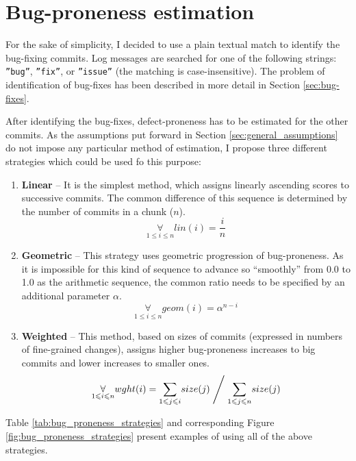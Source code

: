 \documentclass{pracamgr}
\begin{document}

\section{Bug-proneness estimation}
\label{sec:bug-proneness}
For the sake of simplicity, I decided to use a plain textual match to identify the bug-fixing commits. Log messages are searched for one of the following strings: \texttt{''bug''}, \texttt{''fix''}, or \texttt{''issue''} (the matching is case-insensitive). The problem of identification of bug-fixes has been described in more detail in Section \ref{sec:bug-fixes}.

After identifying the bug-fixes, defect-proneness has to be estimated for the other commits. As the assumptions put forward in Section \ref{sec:general_assumptions} do not impose any particular method of estimation, I propose three different strategies which could be used fo this purpose:
\begin{enumerate}[label=(S\arabic*)]
	\item \textbf{Linear} -- It is the simplest method, which assigns linearly ascending scores to successive commits. The common difference of this sequence is determined by the number of commits in a chunk ($n$).
	\[ \underset{1 \leqslant i \leqslant n}{\forall} lin(i) = \frac{i}{n} \]
	\item \textbf{Geometric} -- This strategy uses geometric progression of bug-proneness. As it is impossible for this kind of sequence to advance so ``smoothly'' from 0.0 to 1.0 as the arithmetic sequence, the common ratio needs to be specified by an additional parameter $\alpha$.
	\[ \underset{1 \leqslant i \leqslant n}{\forall} geom(i) = \alpha^{n - i} \]
	\item \textbf{Weighted} -- This method, based on sizes of commits (expressed in numbers of fine-grained changes), assigns higher bug-proneness increases to big commits and lower increases to smaller ones.
	\[ \underset{1 \leqslant i \leqslant n}{\forall} wght(i) =  \underset{1 \leqslant j \leqslant i}{\sum} size(j) \Biggm/ \underset{1 \leqslant j \leqslant n}{\sum} size(j) 	 \]
\end{enumerate}

Table \ref{tab:bug_proneness_strategies} and corresponding Figure \ref{fig:bug_proneness_strategies} present examples of using all of the above strategies.

\end{document}
